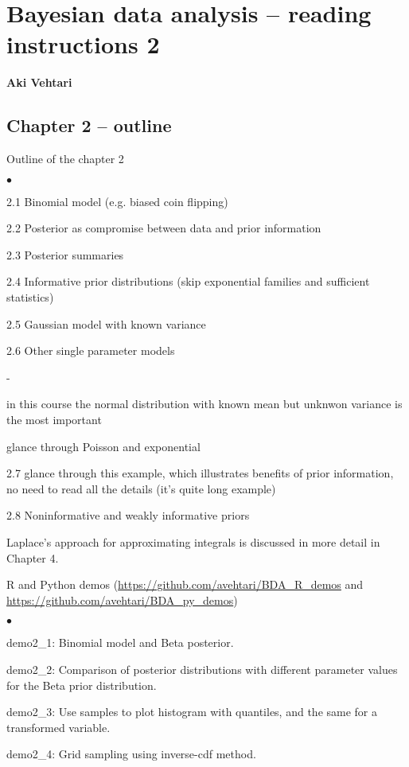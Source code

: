 \documentclass[a4paper,11pt,english]{article}
\begin{document}
\thispagestyle{empty}

\section*{Bayesian data analysis -- reading instructions 2} 
\smallskip
{\bf Aki Vehtari}
\smallskip

\subsection*{Chapter 2 -- outline}

Outline of the chapter 2
\begin{list}{$\bullet$}{\parsep=0pt\itemsep=2pt}
\item 2.1 Binomial model (e.g. biased coin flipping)
\item 2.2 Posterior as compromise between data and prior information
\item 2.3 Posterior summaries
\item 2.4 Informative prior distributions (skip exponential families and sufficient statistics)
\item 2.5 Gaussian model with known variance
\item 2.6 Other single parameter models
  \begin{list}{-}{\parsep=0pt\itemsep=2pt}
  \item in this course the normal distribution with known mean but
    unknwon variance is the most important
  \item glance through Poisson and exponential
  \end{list}
\item 2.7 glance through this example, which illustrates benefits of prior information, no need to read all the details (it's quite long example)
\item 2.8 Noninformative and weakly informative priors
\end{list}

Laplace's approach for approximating integrals is discussed in more
detail in Chapter 4.

R and Python demos (\url{https://github.com/avehtari/BDA_R_demos} and \url{https://github.com/avehtari/BDA_py_demos})
\begin{list}{$\bullet$}{\parsep=0pt\itemsep=2pt}
\item demo2\_1: Binomial model and Beta posterior.
\item demo2\_2: Comparison of posterior distributions with different
parameter values for the Beta prior distribution.
\item demo2\_3: Use samples to plot histogram with quantiles, and
  the same for a transformed variable.
\item demo2\_4: Grid sampling using inverse-cdf method.
\end{list}
\end{document}
